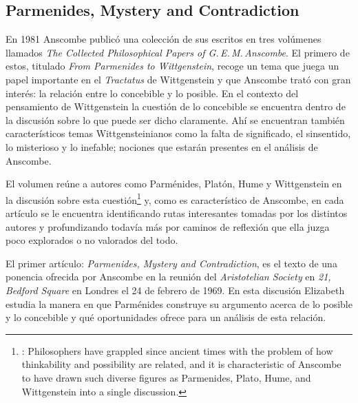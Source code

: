 \subsection{Parmenides, Mystery and Contradiction}

En 1981 Anscombe publicó una colección de sus escritos en tres volúmenes llamados \emph{The Collected Philosophical Papers of G.\,E.\,M.\,Anscombe}. El primero de estos, titulado \emph{From Parmenides to Wittgenstein}, recoge un tema que juega un papel importante en el \emph{Tractatus} de Wittgenstein y que Anscombe trató con gran interés: la relación entre lo concebible y lo posible. En el contexto del pensamiento de Wittgenstein la cuestión de lo concebible se encuentra dentro de la discusión sobre lo que puede ser dicho claramente. Ahí se encuentran también característicos temas Wittgensteinianos como la falta de significado, el sinsentido, lo misterioso y lo inefable; nociones que estarán presentes en el análisis de Anscombe.

    El volumen reúne a autores como Parménides, Platón, Hume y Wittgenstein en la discusión sobre esta cuestión\footnote{\cite[Cf.~][193]{teichmann2008ans}: Philosophers have grappled since ancient times with the problem of how thinkability and possibility are related, and it is characteristic of Anscombe to have drawn such diverse figures as Parmenides, Plato, Hume, and Wittgenstein into a single discussion.} y, como es característico de Anscombe, en cada artículo se le encuentra identificando rutas interesantes tomadas por los distintos autores y profundizando todavía más por caminos de reflexión que ella juzga poco explorados o no valorados del todo.

    El primer artículo: \emph{Parmenides, Mystery and Contradiction}, es el texto de una ponencia ofrecida por Anscombe en la reunión del \emph{Aristotelian Society} en \emph{21, Bedford Square} en Londres el 24 de febrero de 1969. En esta discusión Elizabeth estudia la manera en que Parménides construye su argumento acerca de lo posible y lo concebible y qué oportunidades ofrece para un análisis de esta relación.

